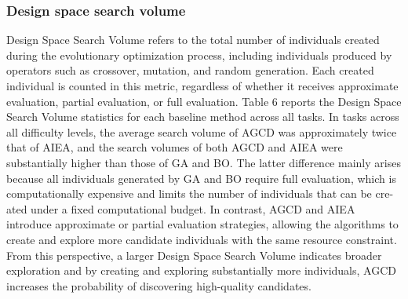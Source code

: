 \documentclass{article}
\begin{document}
    \subsubsection{Design space search volume}
    \label{subsubsec:search_volume} Design Space Search Volume refers to the
    total number of individuals created during the evolutionary optimization
    process, including individuals produced by operators such as crossover,
    mutation, and random generation. Each created individual is counted in this
    metric, regardless of whether it receives approximate evaluation, partial
    evaluation, or full evaluation. Table 6 reports the Design Space Search
    Volume statistics for each baseline method across all tasks. In tasks across
    all difficulty levels, the average search volume of AGCD was approximately
    twice that of AIEA, and the search volumes of both AGCD and AIEA were substantially
    higher than those of GA and BO. The latter difference mainly arises because
    all individuals generated by GA and BO require full evaluation, which is computationally
    expensive and limits the number of individuals that can be cre-ated under a fixed
    computational budget. In contrast, AGCD and AIEA introduce approximate or partial
    evaluation strategies, allowing the algorithms to create and explore more
    candidate individuals with the same resource constraint. From this perspective,
    a larger Design Space Search Volume indicates broader exploration and by
    creating and exploring substantially more individuals, AGCD increases the probability
    of discovering high-quality candidates.
\end{document}
